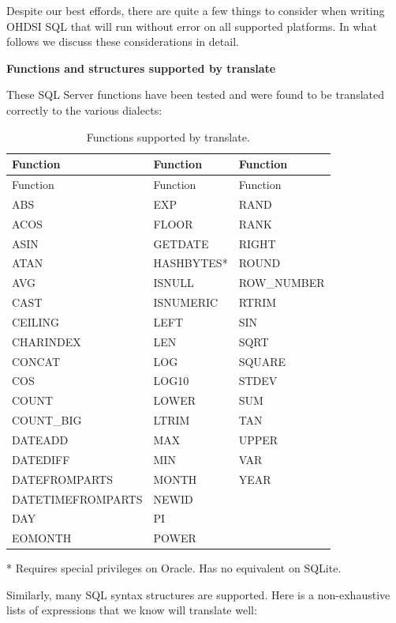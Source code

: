 \documentclass[11pt]{book}
\theoremstyle{definition}
\theoremstyle{definition}
\theoremstyle{definition}
\theoremstyle{remark}
\begin{document}
Despite our best effords, there are quite a few things to consider when writing OHDSI SQL that will run without error on all supported platforms. In what follows we discuss these considerations in detail.

\textbf{Functions and structures supported by translate}

These SQL Server functions have been tested and were found to be translated correctly to the various dialects:

\begin{longtable}[]{@{}lll@{}}
\caption{\label{tab:sqlFunctions} Functions supported by translate.}\tabularnewline
\toprule
Function & Function & Function\tabularnewline
\midrule
\endfirsthead
\toprule
Function & Function & Function\tabularnewline
\midrule
\endhead
ABS & EXP & RAND\tabularnewline
ACOS & FLOOR & RANK\tabularnewline
ASIN & GETDATE & RIGHT\tabularnewline
ATAN & HASHBYTES* & ROUND\tabularnewline
AVG & ISNULL & ROW\_NUMBER\tabularnewline
CAST & ISNUMERIC & RTRIM\tabularnewline
CEILING & LEFT & SIN\tabularnewline
CHARINDEX & LEN & SQRT\tabularnewline
CONCAT & LOG & SQUARE\tabularnewline
COS & LOG10 & STDEV\tabularnewline
COUNT & LOWER & SUM\tabularnewline
COUNT\_BIG & LTRIM & TAN\tabularnewline
DATEADD & MAX & UPPER\tabularnewline
DATEDIFF & MIN & VAR\tabularnewline
DATEFROMPARTS & MONTH & YEAR\tabularnewline
DATETIMEFROMPARTS & NEWID &\tabularnewline
DAY & PI &\tabularnewline
EOMONTH & POWER &\tabularnewline
\bottomrule
\end{longtable}

* Requires special privileges on Oracle. Has no equivalent on SQLite.

Similarly, many SQL syntax structures are supported. Here is a non-exhaustive lists of expressions that we know will translate well:
\end{document}
